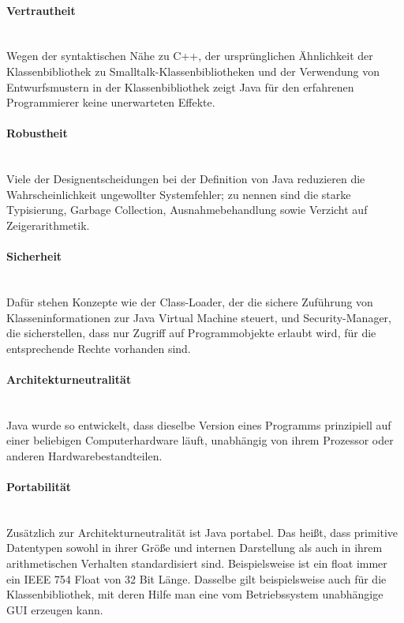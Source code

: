 \paragraph{Vertrautheit}\ \\
Wegen der syntaktischen Nähe zu C++, der ursprünglichen Ähnlichkeit der Klassenbibliothek zu Smalltalk-Klassenbibliotheken und der Verwendung von Entwurfsmustern in der Klassenbibliothek zeigt Java für den erfahrenen Programmierer keine unerwarteten Effekte.

\paragraph{Robustheit}\ \\
Viele der Designentscheidungen bei der Definition von Java reduzieren die Wahrscheinlichkeit ungewollter Systemfehler; zu nennen sind die starke Typisierung, Garbage Collection, Ausnahmebehandlung sowie Verzicht auf Zeigerarithmetik.


\paragraph{Sicherheit}\ \\
Dafür stehen Konzepte wie der Class-Loader, der die sichere Zuführung von Klasseninformationen zur Java Virtual Machine steuert, und Security-Manager, die sicherstellen, dass nur Zugriff auf Programmobjekte erlaubt wird, für die entsprechende Rechte vorhanden sind.

\paragraph{Architekturneutralität}\ \\
Java wurde so entwickelt, dass dieselbe Version eines Programms prinzipiell auf einer beliebigen Computerhardware läuft, unabhängig von ihrem Prozessor oder anderen Hardwarebestandteilen.

\paragraph{Portabilität}\ \\
Zusätzlich zur Architekturneutralität ist Java portabel. Das heißt, dass primitive Datentypen sowohl in ihrer Größe und internen Darstellung als auch in ihrem arithmetischen Verhalten standardisiert sind. Beispielsweise ist ein float immer ein IEEE 754 Float von 32 Bit Länge. Dasselbe gilt beispielsweise auch für die Klassenbibliothek, mit deren Hilfe man eine vom Betriebssystem unabhängige GUI erzeugen kann.

